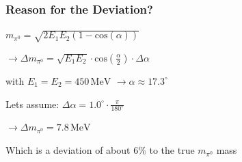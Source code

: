 \documentclass[slidestop,compress,mathserif]{beamer}
\begin{document}
\begin{frame}
	\frametitle{Reason for the Deviation?}
	\begin{center}
	
	$m_{\pi^0}=\sqrt{2 E_1E_2(1-\text{cos}(\alpha))}$
	
		$\rightarrow \Delta m_{\pi^0} =\sqrt{E_1 E_2} \cdot \text{cos}(\frac{\alpha}{2}) \cdot \Delta \alpha$
		\end{center} 
		
			\begin{center}
				
		with $E_1 = E_2 = 450\,\text{MeV}$ $\rightarrow \alpha \approx  17.3^{\circ}$
		
	\end{center}
			
	\begin{center}
					
		Lets assume: $\Delta \alpha = 1.0^{\circ} \cdot \frac{\pi}{180^{\circ}}$
		
		$\rightarrow \Delta m_{\pi^0} = 7.8\,\text{MeV}$
		
		Which is a deviation of about $6\%$ to the true $m_{\pi^0}$ mass
		
	\end{center}

\end{frame}
\end{document}

